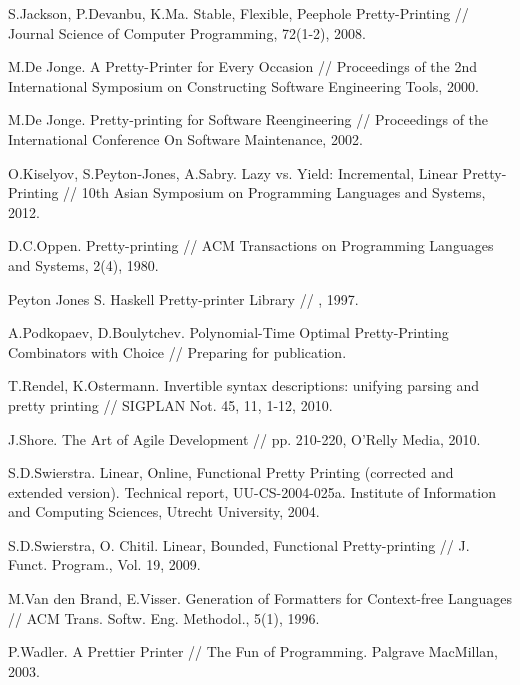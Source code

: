 \begin{thebibliography}{9001}
 S.Jackson, P.Devanbu, K.Ma. Stable, Flexible, Peephole Pretty-Printing // Journal Science of Computer Programming, 72(1-2), 2008.

 M.De Jonge. A Pretty-Printer for Every Occasion // Proceedings of the 2nd International Symposium on Constructing 
Software Engineering Tools, 2000.

 M.De Jonge. Pretty-printing for Software Reengineering // Proceedings of the International Conference On Software Maintenance, 2002.

 O.Kiselyov, S.Peyton-Jones, A.Sabry. Lazy vs. Yield: Incremental, Linear Pretty-Printing // 10th Asian Symposium on Programming Languages and Systems, 
2012.

 D.C.Oppen. Pretty-printing // ACM Transactions on Programming Languages and Systems, 2(4), 1980.

 Peyton Jones S. Haskell Pretty-printer Library // , 1997.

 A.Podkopaev, D.Boulytchev.
Polynomial-Time Optimal Pretty-Printing Combinators with Choice // Preparing for publication. 

 T.Rendel, K.Ostermann. Invertible syntax descriptions: unifying parsing and pretty printing // SIGPLAN Not. 45, 11, 1-12, 2010.

 J.Shore. The Art of Agile Development // pp. 210-220, O'Relly Media, 2010.

 S.D.Swierstra. Linear, Online, Functional Pretty Printing (corrected and extended version).
Technical report, UU-CS-2004-025a. Institute of Information and Computing Sciences, Utrecht University, 2004.

 S.D.Swierstra, O. Chitil. Linear, Bounded, Functional Pretty-printing // J. Funct. Program., Vol. 19,
2009.

 M.Van den Brand, E.Visser. Generation of Formatters for Context-free Languages // ACM Trans. Softw. Eng. Methodol., 5(1), 1996.

 P.Wadler. A Prettier Printer // The Fun of Programming. Palgrave MacMillan, 2003.


\end{thebibliography}
